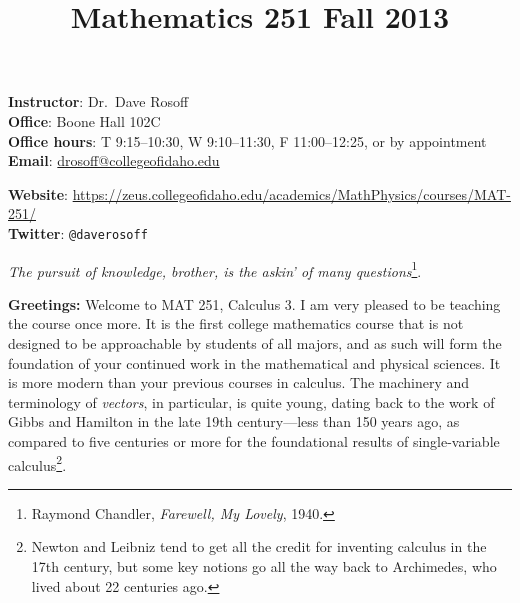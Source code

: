 \documentclass[12pt,twoside]{amsart}
\title{{\LARGE Mathematics 251 \hfill Fall 2013}}
\begin{document}
\maketitle
\thispagestyle{empty}
\vspace*{-2ex}
\begin{minipage}[t]{0.45\linewidth}
    \textbf{Instructor}: Dr.\ Dave Rosoff  \\
    \textbf{Office}: Boone Hall 102C \\
    \textbf{Office hours}: T 9:15--10:30, W 9:10--11:30, F 11:00--12:25, or by appointment \\
    \textbf{Email}: \href{mailto:drosoff@collegeofidaho.edu}{drosoff@collegeofidaho.edu} \\
\end{minipage} 
\hspace*{0.09\linewidth}
\begin{minipage}[t]{0.45\linewidth}\begin{flushright}
    \textbf{Website}: \url{https://zeus.collegeofidaho.edu/academics/MathPhysics/courses/MAT-251/} \\
    \textbf{Twitter}: \verb|@daverosoff|
\end{flushright}
\end{minipage}
\vspace*{-2ex}
\begin{center}

{\large \emph{The pursuit of knowledge, brother, is the askin' of many questions}\footnote{Raymond Chandler, \emph{Farewell, My Lovely}, 1940.}}.

\end{center}

\textbf{Greetings:} Welcome to MAT 251, Calculus 3. I am very pleased to be teaching the course once more. It is the first college mathematics course that is not designed to be approachable by students of all majors, and as such will form the foundation of your continued work in the mathematical and physical sciences. It is more modern than your previous courses in calculus. The machinery and terminology of \emph{vectors}, in particular, is quite young, dating back to the work of Gibbs and Hamilton in the late 19th century---less than 150 years ago, as compared to five centuries or more for the foundational results of single-variable calculus\footnote{Newton and Leibniz tend to get all the credit for inventing calculus in the 17th century, but some key notions go all the way back to Archimedes, who lived about 22 centuries ago.}.
\end{document}
